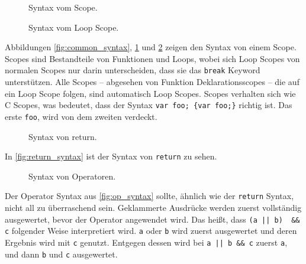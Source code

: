     \begin{figure}[H]
      \centering
      
      \caption{Syntax vom Scope.}
      \label{fig:scope_syntax}
    \end{figure}

    \begin{figure}[H]
      \centering
      
      \caption{Syntax vom Loop Scope.}
      \label{fig:loop_scope_syntax}
    \end{figure}
    Abbildungen \ref{fig:common_syntax}, \ref{fig:scope_syntax} und \ref{fig:loop_scope_syntax} zeigen den Syntax von einem Scope. Scopes sind Bestandteile von Funktionen und Loops, wobei sich Loop Scopes von normalen Scopes nur darin unterscheiden, dass sie das \lstinline[style=MyMacroStyle]$break$ Keyword unterstützen. Alle Scopes -- abgesehen von Funktion Deklarationsscopes -- die auf ein Loop Scope folgen, sind automatisch Loop Scopes. Scopes verhalten sich wie C Scopes, was bedeutet, dass der Syntax \lstinline[style=MyMacroStyle]$var foo; {var foo;}$ richtig ist. Das erste \lstinline[style=MyMacroStyle]$foo$, wird von dem zweiten verdeckt.

    \begin{figure}[H]
      \centering
      
      \caption{Syntax von return.}
      \label{fig:return_syntax}
    \end{figure}
    In \autoref{fig:return_syntax} ist der Syntax von \lstinline[style=MyMacroStyle]$return$ zu sehen.

    \begin{figure}[H]
      \centering
      
      \caption{Syntax von Operatoren.}
      \label{fig:op_syntax}
    \end{figure}
    Der Operator Syntax aus \autoref{fig:op_syntax} sollte, ähnlich wie der \lstinline[style=MyMacroStyle]$return$ Syntax, nicht all zu überraschend sein. Geklammerte Ausdrücke werden zuerst vollständig ausgewertet, bevor der Operator angewendet wird. Das heißt, dass \lstinline[style=MyMacroStyle]$(a || b)  && c$ folgender Weise interpretiert wird. \lstinline[style=MyMacroStyle]$a$ oder \lstinline[style=MyMacroStyle]$b$ wird zuerst ausgewertet und deren Ergebnis wird mit \lstinline[style=MyMacroStyle]$c$ genutzt. Entgegen dessen wird bei \lstinline[style=MyMacroStyle]$a || b && c$ zuerst \lstinline[style=MyMacroStyle]$a$, und dann \lstinline[style=MyMacroStyle]$b$ und \lstinline[style=MyMacroStyle]$c$ ausgewertet.

